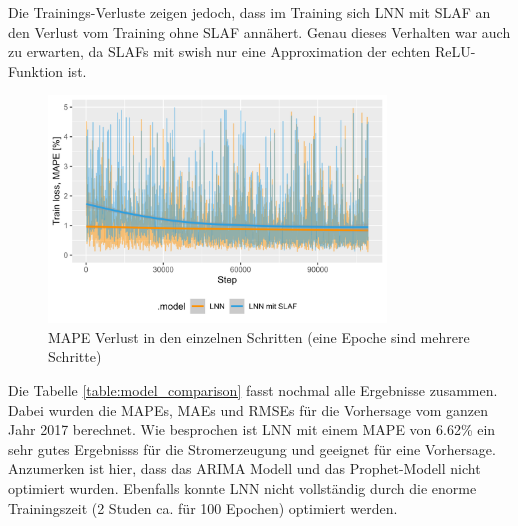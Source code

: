 \documentclass[11pt,ngerman,a4paper,]{article}
\begin{document}
Die Trainings-Verluste zeigen jedoch, dass im Training sich LNN mit SLAF an den Verlust vom Training ohne SLAF annähert. Genau dieses Verhalten war auch zu erwarten, da SLAFs mit swish nur eine Approximation der echten ReLU-Funktion ist.

\begin{figure}[H]
\centering
\includegraphics[width=0.8\textwidth]{plots/training_loss.png}
\caption{MAPE Verlust in den einzelnen Schritten (eine Epoche sind mehrere Schritte)}
\label{fig:train_loss}
\end{figure}

\clearpage
\newpage

Die Tabelle \ref{table:model_comparison} fasst nochmal alle Ergebnisse zusammen. Dabei wurden die MAPEs, MAEs und RMSEs für die Vorhersage vom ganzen Jahr 2017 berechnet. Wie besprochen ist LNN mit einem MAPE von 6.62\% ein sehr gutes Ergebnisss für die Stromerzeugung und geeignet für eine Vorhersage. Anzumerken ist hier, dass das ARIMA Modell und das Prophet-Modell nicht optimiert wurden. Ebenfalls konnte LNN nicht vollständig durch die enorme Trainingszeit (2 Studen ca. für 100 Epochen) optimiert werden.
\end{document}
